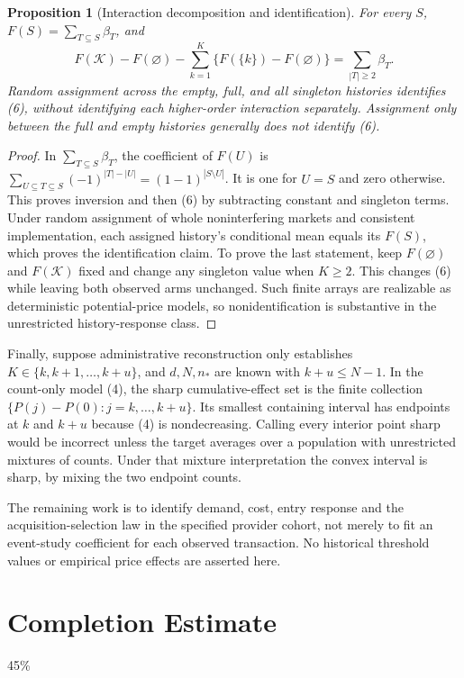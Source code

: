 \documentclass[11pt]{article}
\newtheorem{proposition}[theorem]{Proposition}
\theoremstyle{remark}
\begin{document}
\begin{proposition}[Interaction decomposition and identification]
For every $S$, $F(S)=\sum_{T\subseteq S}\beta_T$, and
\[
 F(\mathcal K)-F(\varnothing)
 -\sum_{k=1}^K\{F(\{k\})-F(\varnothing)\}
 =\sum_{|T|\geq2}\beta_T.                               \tag{6}
\]
Random assignment across the empty, full, and all singleton histories identifies (6), without identifying each higher-order interaction separately. Assignment only between the full and empty histories generally does not identify (6).
\end{proposition}
\begin{proof}
In $\sum_{T\subseteq S}\beta_T$, the coefficient of $F(U)$ is
$\sum_{U\subseteq T\subseteq S}(-1)^{|T|-|U|}=(1-1)^{|S\setminus U|}$.
It is one for $U=S$ and zero otherwise. This proves inversion and then (6) by subtracting constant and singleton terms. Under random assignment of whole noninterfering markets and consistent implementation, each assigned history's conditional mean equals its $F(S)$, which proves the identification claim. To prove the last statement, keep $F(\varnothing)$ and $F(\mathcal K)$ fixed and change any singleton value when $K\geq2$. This changes (6) while leaving both observed arms unchanged. Such finite arrays are realizable as deterministic potential-price models, so nonidentification is substantive in the unrestricted history-response class.
\end{proof}

Finally, suppose administrative reconstruction only establishes $K\in\{k,k+1,\ldots,k+u\}$, and $d,N,n_*$ are known with $k+u\leq N-1$. In the count-only model (4), the sharp cumulative-effect set is the finite collection
$\{P(j)-P(0):j=k,\ldots,k+u\}$. Its smallest containing interval has endpoints at $k$ and $k+u$ because (4) is nondecreasing. Calling every interior point sharp would be incorrect unless the target averages over a population with unrestricted mixtures of counts. Under that mixture interpretation the convex interval is sharp, by mixing the two endpoint counts.

The remaining work is to identify demand, cost, entry response and the acquisition-selection law in the specified provider cohort, not merely to fit an event-study coefficient for each observed transaction. No historical threshold values or empirical price effects are asserted here.

\section{Completion Estimate}
45\%
\end{document}
